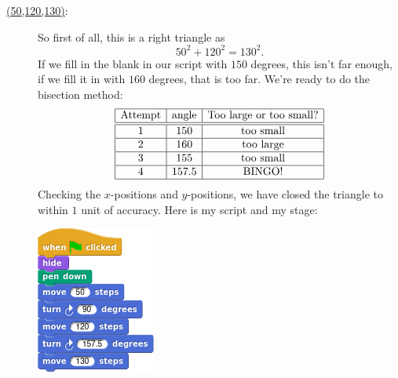 \documentclass[noauthor,nooutcomes,12pt]{ximera}
\begin{document}
\begin{question}
\begin{freeResponse}
\begin{description}
      \item[\underline{(50,120,130)}:] So first of all, this is a right
        triangle as
        \[
        50^2 + 120^2 =130^2.
        \]
        If we fill in the blank in our script with $150$ degrees, this
        isn't far enough, if we fill it in with $160$ degrees, that is
        too far. We're ready to do the bisection method:
        \[
        \begin{array}{|c|c|c|c|}\hline
          \text{Attempt} & \text{angle} & \text{Too large or too small?} \\ \hline\hline
          1 & 150 & \text{too small} \\ \hline
          2 & 160 & \text{too large}  \\ \hline
          3 & 155 & \text{too small}  \\ \hline
          4 & 157.5 & \text{BINGO!}  \\ \hline
        \end{array}
        \]
        Checking the $x$-positions and $y$-positions, we have closed
        the triangle to within $1$ unit of accuracy. Here is my script and my stage:
        \begin{center}
          \includegraphics[width=.3\textwidth]{50120130-script.png}   \qquad {}
        \end{center}




      




\end{description}
\end{freeResponse}
\end{question}
\end{document}
